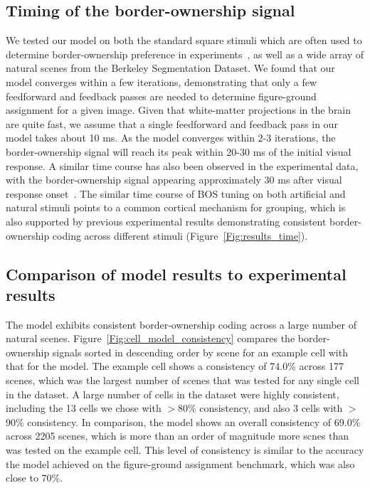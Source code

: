 \documentclass[12pt]{article}
\begin{document}
\subsection{Timing of the border-ownership signal}
We tested our model on both the standard square stimuli which are often used to determine border-ownership preference in experiments~\citep{Zhou_etal00}, as well as a wide array of natural scenes from the Berkeley Segmentation Dataset. We found that our model converges within a few iterations, demonstrating that only a few feedforward and feedback passes are needed to determine figure-ground assignment for a given image.
Given that white-matter projections in the brain are quite fast, we assume that a single feedforward and feedback pass in our model takes about 10 ms. As the model converges within 2-3 iterations, the border-ownership signal will reach its peak within 20-30 ms of the initial visual response. A similar time course has also been observed in the experimental data, with the border-ownership signal appearing approximately 30 ms after visual response onset~\citep{Williford_vonderHeydt16}.
%
The similar time course of BOS tuning on both artificial and natural stimuli points to a common cortical mechanism for grouping, which is also supported by previous experimental results demonstrating consistent border-ownership coding across different stimuli (Figure~\ref{Fig:results_time}).

\subsection{Comparison of model results to experimental results}
The model exhibits consistent border-ownership coding across a large number of natural scenes. Figure~\ref{Fig:cell_model_consistency} compares the border-ownership signals sorted in descending order by scene for an example cell with that for the model. The example cell shows a consistency of 74.0\% across 177 scenes, which was the largest number of scenes that was tested for any single cell in the dataset. A large number of cells in the dataset were highly consistent, including the 13 cells we chose with $>$80\% consistency, and also 3 cells with $>$90\% consistency. In comparison, the model shows an overall consistency of 69.0\% across 2205 scenes, which is more than an order of magnitude more scnes than was tested on the example cell. This level of consistency is similar to the accuracy the model achieved on the figure-ground assignment benchmark, which was also close to 70\%.
\end{document}
